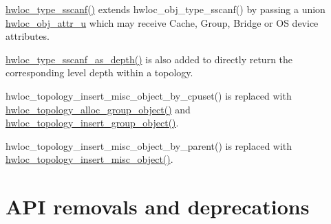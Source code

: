\begin{DoxyItemize}
\item \hyperlink{a00188_ga510f21b066fba2dab12b8c9b173b1dfd}{hwloc\+\_\+type\+\_\+sscanf()} extends hwloc\+\_\+obj\+\_\+type\+\_\+sscanf() by passing a union \hyperlink{a00242}{hwloc\+\_\+obj\+\_\+attr\+\_\+u} which may receive Cache, Group, Bridge or OS device attributes. 


\item \hyperlink{a00188_ga52c63cd7203e55b804c1314affc9bd12}{hwloc\+\_\+type\+\_\+sscanf\+\_\+as\+\_\+depth()} is also added to directly return the corresponding level depth within a topology. 


\item hwloc\+\_\+topology\+\_\+insert\+\_\+misc\+\_\+object\+\_\+by\+\_\+cpuset() is replaced with \hyperlink{a00194_ga4cea4741165faf5323931a9ed8786ef7}{hwloc\+\_\+topology\+\_\+alloc\+\_\+group\+\_\+object()} and \hyperlink{a00194_ga1fc6012b3e1c249b83f48cb7bcacaa5b}{hwloc\+\_\+topology\+\_\+insert\+\_\+group\+\_\+object()}. 


\item hwloc\+\_\+topology\+\_\+insert\+\_\+misc\+\_\+object\+\_\+by\+\_\+parent() is replaced with \hyperlink{a00194_gad980782ade737900c5cf208946768c30}{hwloc\+\_\+topology\+\_\+insert\+\_\+misc\+\_\+object()}. 


\end{DoxyItemize}

 \hypertarget{a00395_upgrade_to_api_2x_removals}{}\section{A\+P\+I removals and deprecations}\label{a00395_upgrade_to_api_2x_removals}

